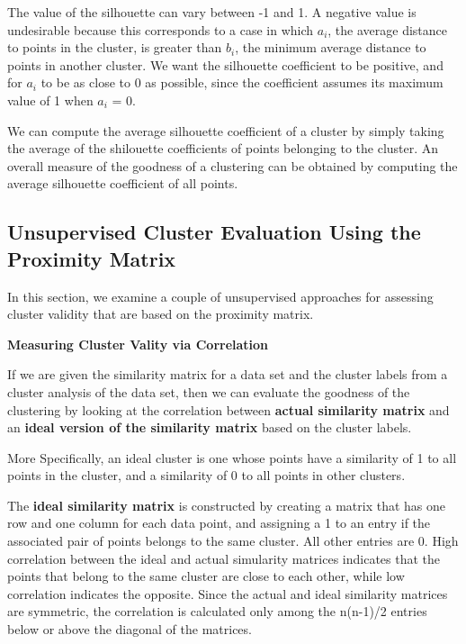 				The value of the silhouette can vary between -1 and 1. A negative value is
				undesirable because this corresponds to a case in which $a_{i}$, the average
				distance to points in the cluster, is greater than $b_{i}$, the minimum
				average distance to points in another cluster. We want the silhouette
				coefficient to be positive, and for $a_{i}$ to be as close to 0 as possible,
				since the coefficient assumes its maximum value of 1 when $a_{i}$ = 0.

				We can compute the average silhouette coefficient of a cluster by simply
				taking the average of the shilouette coefficients of points belonging to the
				cluster. An overall measure of the goodness of a clustering can be obtained
				by computing the average silhouette coefficient of all points. 


		\subsection{Unsupervised Cluster Evaluation Using the Proximity Matrix}

			In this section, we examine a couple of unsupervised approaches for assessing
			cluster validity that are based on the proximity matrix. 

			{\bf Measuring Cluster Vality via Correlation}

			If we are given the similarity matrix for a data set and the cluster labels from
			a cluster analysis of the data set, then we can evaluate the goodness of the 
			clustering by looking at the correlation between {\bf actual similarity matrix} and an 
			{\bf ideal version of the similarity matrix} based on the cluster labels. 

			More Specifically, an ideal cluster is one whose points have a similarity
			of 1 to all points in the cluster, and a similarity of 0 to all points
			in other clusters.

			The {\bf ideal similarity matrix} is constructed by creating a matrix that has one
			row and one column  for each data point, and assigning a 1 to an entry if the 
			associated pair of points belongs to the same cluster. All other entries are 0.
			High correlation between the ideal and actual simularity matrices indicates
			that the points that belong to the same cluster are close to each other, while
			low correlation indicates the opposite. 
			Since the actual and ideal similarity matrices are symmetric, the correlation is
			calculated only among the n(n-1)/2 entries below or above the diagonal of the matrices.


